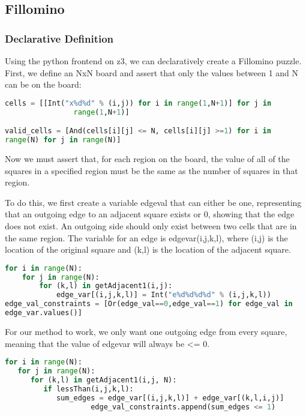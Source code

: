 \subsection{Fillomino}

\subsubsection{Declarative Definition}
Using the python frontend on z3, we can declaratively create a Fillomino puzzle.
First, we define an NxN board and assert that only the values between
1 and N can be on the board: 

\singlespace
\begin{lstlisting}[language=python]
cells = [[Int("x%d%d" % (i,j)) for i in range(1,N+1)] for j in
                range(1,N+1)]

valid_cells = [And(cells[i][j] <= N, cells[i][j] >=1) for i in
range(N) for j in range(N)]
\end{lstlisting}
\doublespace

Now we must assert that, for each region on the board, the value of
all of the squares in a specified region must be the same as the
number of squares in that region.
 

To do this, we first create a variable edgeval that can either be one,
representing that an outgoing edge to an adjacent square exists or 0,
showing that the edge does not exist. An outgoing side should only
exist between two cells that are in the same region. The variable for
an edge is edgevar(i,j,k,l), where (i,j) is the location of the
original square and (k,l) is the location of the adjacent square.

\singlespace
\begin{lstlisting}[language=python]
for i in range(N):
    for j in range(N):
        for (k,l) in getAdjacent1(i,j):
            edge_var[(i,j,k,l)] = Int("e%d%d%d%d" % (i,j,k,l))
edge_val_constraints = [Or(edge_val==0,edge_val==1) for edge_val in
edge_var.values()]
\end{lstlisting}
\doublespace

For our method to work, we only want one outgoing edge from every
square, meaning that the value of edgevar will always be <= 0.

\singlespace
\begin{lstlisting}[language=python]
for i in range(N):
   for j in range(N):
      for (k,l) in getAdjacent1(i,j, N):
         if lessThan(i,j,k,l):
            sum_edges = edge_var[(i,j,k,l)] + edge_var[(k,l,i,j)]
                    edge_val_constraints.append(sum_edges <= 1)
\end{lstlisting}
\doublespace

